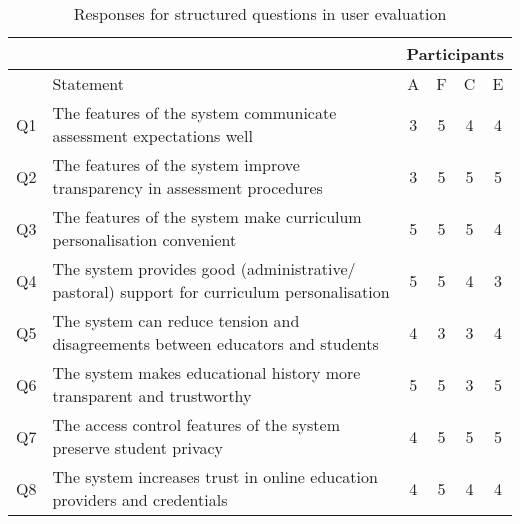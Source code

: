 \begin{table}[!ht]
	\caption{Responses for structured questions in user evaluation}
	\centering
	\label{table:structuredresp_eval}
	\begin{tabularx}{\textwidth}{|c|X|c|c|c|c|}
		\hline
		   &                                                                                            & \multicolumn{4}{c|}{Participants}                                                                                \\
		\hline
		   & Statement                                                                                  & A                                 & F                      & C                        & E                        \\
		\hline
		Q1 & The features of the system communicate assessment expectations well                        & \cellcolor{Dandelion}3            & \cellcolor{green}5     & \cellcolor{SpringGreen}4 & \cellcolor{SpringGreen}4 \\
		\hline
		Q2 & The features of the system improve transparency in assessment procedures                   & \cellcolor{Dandelion}3            & \cellcolor{green}5     & \cellcolor{green}5       & \cellcolor{green}5       \\
		\hline
		Q3 & The features of the system make curriculum personalisation convenient                      & \cellcolor{green}5                & \cellcolor{green}5     & \cellcolor{green}5       & \cellcolor{SpringGreen}4 \\
		\hline
		Q4 & The system provides good (administrative/ pastoral) support for curriculum personalisation & \cellcolor{green}5                & \cellcolor{green}5     & \cellcolor{SpringGreen}4 & \cellcolor{Dandelion}3   \\
		\hline
		Q5 & The system can reduce tension and disagreements between educators and students             & \cellcolor{SpringGreen}4          & \cellcolor{Dandelion}3 & \cellcolor{Dandelion}3   & \cellcolor{SpringGreen}4 \\
		\hline
		Q6 & The system makes educational history more transparent and trustworthy                      & \cellcolor{green}5                & \cellcolor{green}5     & \cellcolor{Dandelion}3   & \cellcolor{green}5       \\
		\hline
		Q7 & The access control features of the system preserve student privacy                         & \cellcolor{SpringGreen}4          & \cellcolor{green}5     & \cellcolor{green}5       & \cellcolor{green}5       \\
		\hline
		Q8 & The system increases trust in online education providers and credentials                   & \cellcolor{SpringGreen}4          & \cellcolor{green}5     & \cellcolor{SpringGreen}4 & \cellcolor{SpringGreen}4 \\
		\hline
	\end{tabularx}
\end{table}

